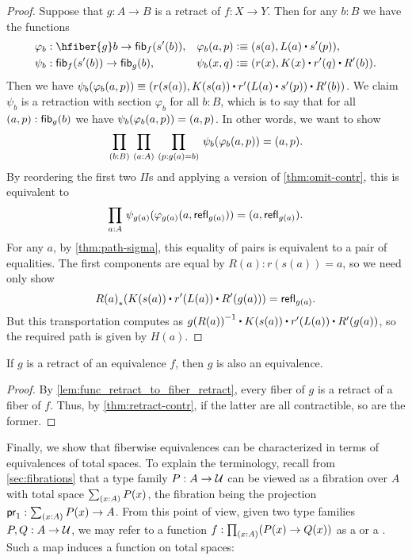 \begin{proof}
Suppose that $g:A\to B$ is a retract of $f:X\to Y$. Then for any $b:B$ we have the functions
\begin{align*}
\varphi_b &:\hfiber{g}b\to\hfib{f}{s'(b)}, &
\varphi_b(a,p) & \defeq \pairr{s(a),L(a)\ct s'(p)},\\
\psi_b &:\hfib{f}{s'(b)}\to\hfib{g}b, &
\psi_b(x,q) &\defeq \pairr{r(x),K(x)\ct r'(q)\ct R'(b)}.
\end{align*}
Then we have $\psi_b(\varphi_b({a,p}))\equiv\pairr{r(s(a)),K(s(a))\ct r'(L(a)\ct s'(p))\ct R'(b)}$.
We claim $\psi_b$ is a retraction with section $\varphi_b$ for all $b:B$, which is to say that for all $(a,p):{\mathsf{fib}}_{g}(b)$ we have $\psi_b(\varphi_b({a,p}))= {\mathopen{}(a,p)\mathclose{}}$.
In other words, we want to show
\begin{equation*}
\prd{b:B}{a:A}{p:g(a)=b} \psi_b(\varphi_b({a,p}))= \pairr{a,p}.
\end{equation*}
By reordering the first two $\Pi$s and applying a version of \cref{thm:omit-contr}, this is equivalent to
\begin{equation*}
\prd{a:A}\psi_{g(a)}(\varphi_{g(a)}({a,\refl{g(a)}}))=\pairr{a,\refl{g(a)}}.
\end{equation*}
For any $a$, by \cref{thm:path-sigma}, this equality of pairs is equivalent to a pair of equalities. The first components are equal by $R(a):r(s(a))= a$, so we need only show
\begin{equation*}
\trans{R(a)}{K(s(a))\ct r'(L(a))\ct R'(g(a))} = \refl{g(a)}.
\end{equation*}
But this transportation computes as $\opp{g(R(a))}\ct K(s(a))\ct r'(L(a))\ct R'(g(a))$, so the required path is given by $H(a)$.
\end{proof}

\begin{thm}\label{thm:retract-equiv}
  If $g$ is a retract of an equivalence $f$, then $g$ is also an equivalence.
\end{thm}
\begin{proof}
  By \cref{lem:func_retract_to_fiber_retract}, every fiber of $g$ is a retract of a fiber of $f$.
  Thus, by \cref{thm:retract-contr}, if the latter are all contractible, so are the former.
\end{proof}

%

%
%
Finally, we show that fiberwise equivalences can be characterized in terms of equivalences of total spaces.
To explain the terminology, recall from \cref{sec:fibrations} that a type family $P:A\to\mathcal{U}$ can be viewed as a fibration over $A$ with total space $\sm{x:A} P(x)$, the fibration being the projection $\proj1:\sm{x:A} P(x) \to A$.
From this point of view, given two type families $P,Q:A\to\mathcal{U}$, we may refer to a function $f:\prd{x:A} (P(x)\to Q(x))$ as a  or a .
%
%
%
%
Such a map induces a function on total spaces:


